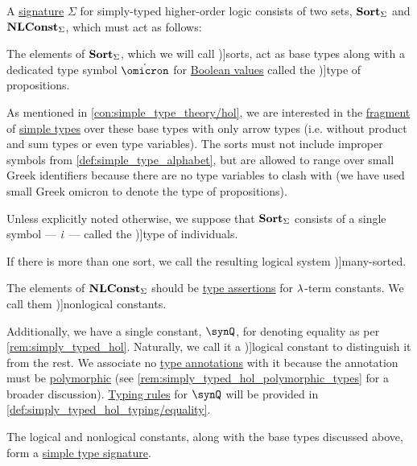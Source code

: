 \begin{definition}\label{def:simply_typed_hol_signature}\mimprovised
  A \hyperref[con:improper_symbol]{signature} \( \Sigma \) for simply-typed higher-order logic consists of two  sets, \( \op*{Sort}_\Sigma \) and \( \op*{NLConst}_\Sigma \), which must act as follows:
  \begin{thmenum}
     The elements of \( \op*{Sort}_\Sigma \), which we will call \term[en=sorts (\cite[35]{BaaderNipkow2012TermRewriting})]{sorts}, act as base types along with a dedicated type symbol \( \syn\omicron \) for \hyperref[con:boolean_value]{Boolean values} called the \term[en=type of propositions (\cite[56]{Church1940STT})]{type of propositions}.

    As mentioned in \cref{con:simple_type_theory/hol}, we are interested in the \hyperref[con:syntax_fragment]{fragment} of \hyperref[def:simple_type]{simple types} over these base types with only arrow types (i.e. without product and sum types or even type variables). The sorts must not include improper symbols from \cref{def:simple_type_alphabet}, but are allowed to range over small Greek identifiers because there are no type variables to clash with (we have used small Greek omicron to denote the type of propositions).

    Unless explicitly noted otherwise, we suppose that \( \op*{Sort}_\Sigma \) consists of a single symbol --- \( \dot{\iota} \) --- called the \term[en=type of individuals (\cite[56]{Church1940STT})]{type of individuals}.

    If there is more than one sort, we call the resulting logical system \term[en=many-sorted predicate logic (\cite[\S 4.4.13]{TroelstraSchwichtenberg2000BasicProofTheory})]{many-sorted}.

     The elements of \( \op*{NLConst}_\Sigma \) should be \hyperref[def:type_assertion]{type assertions} for  \( {\mathrm \lambda} \)-term constants. We call them \term[en=nonlogical constants (\cite[211]{Andrews2002Logic})]{nonlogical constants}.

    Additionally, we have a single constant, \( \synQ \), for denoting equality as per \cref{rem:simply_typed_hol}. Naturally, we call it a \term[en=logical constants (\cite[211]{Andrews2002Logic})]{logical constant} to distinguish it from the rest. We associate no \hyperref[con:type_annotation]{type annotations} with it because the annotation must be \hyperref[def:polymorphic_typed_lambda_calculus]{polymorphic} (see \cref{rem:simply_typed_hol_polymorphic_types} for a broader discussion). \hyperref[con:typing_rule]{Typing rules} for \( \synQ \) will be provided in \cref{def:simply_typed_hol_typing/equality}.

    The logical and nonlogical constants, along with the base types discussed above, form a \hyperref[def:simple_type_signature]{simple type signature}.
  \end{thmenum}
\end{definition}

